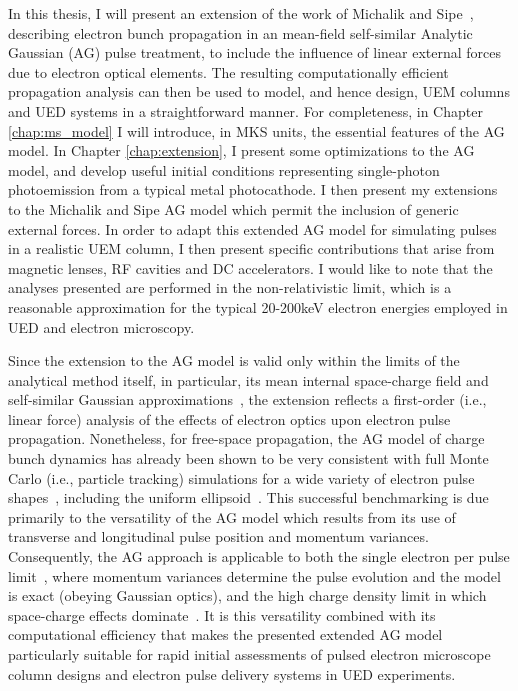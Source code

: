 In this thesis, I will present an extension of the work of Michalik and Sipe~\cite{michalik_analytic_2006,michalik_erratum:_2008}, describing electron bunch propagation in an mean-field self-similar Analytic Gaussian (AG) pulse treatment, to include the influence of linear external forces due to electron optical elements.
The resulting computationally efficient propagation analysis can then be used to model, and hence design, UEM columns and UED systems in a straightforward manner.
For completeness, in Chapter \ref{chap:ms_model} I will introduce, in MKS units, the essential features of the AG model.
In Chapter \ref{chap:extension}, I present some optimizations to the AG model, and develop useful initial conditions representing single-photon photoemission from a typical metal photocathode.
I then present my extensions to the Michalik and Sipe AG model which permit the inclusion of generic external forces.
In order to adapt this extended AG model for simulating pulses in a realistic UEM column, I then present specific contributions that arise from magnetic lenses, RF cavities and DC accelerators.
I would like to note that the analyses presented are performed in the non-relativistic limit, which is a reasonable approximation for the typical 20-200keV electron energies employed in UED and electron microscopy.

Since the extension to the AG model is valid only within the limits of the analytical method itself, in particular, its mean internal space-charge field and self-similar Gaussian approximations~\cite{michalik_analytic_2006}, the extension reflects a first-order (i.e., linear force) analysis of the effects of electron optics upon electron pulse propagation.
Nonetheless, for free-space propagation, the AG model of charge bunch dynamics has already been shown to be very consistent with full Monte Carlo (i.e., particle tracking) simulations for a wide variety of electron pulse shapes~\cite{michalik_analytic_2006,michalik_evolution_2009}, including the uniform ellipsoid~\cite{luiten_how_2004}.
This successful benchmarking is due primarily to the versatility of the AG model which results from its use of transverse and longitudinal pulse position and momentum variances.
Consequently, the AG approach is applicable to both the single electron per pulse limit~\cite{lobastov_four-dimensional_2005}, where momentum variances determine the pulse evolution and the model is exact (obeying Gaussian optics), and the high charge density limit in which space-charge effects dominate~\cite{luiten_how_2004,siwick_ultrafast_2002,cao_femtosecond_2003}.
It is this versatility combined with its computational efficiency that makes the presented extended AG model particularly suitable for rapid initial assessments of pulsed electron microscope column designs and electron pulse delivery systems in UED experiments.

